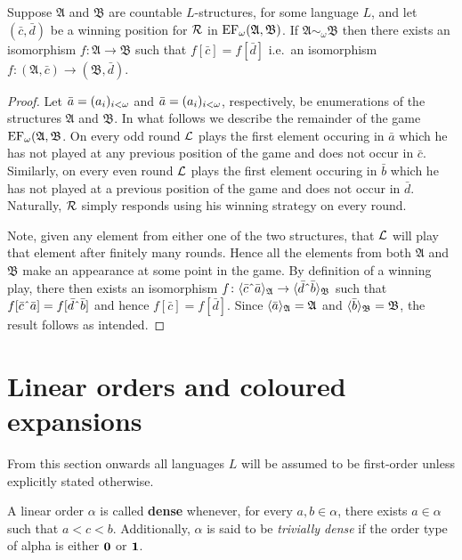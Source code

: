 \begin{prp}\label{prp:bfiso}
	Suppose $\mathfrak{A}$ and $\mathfrak{B}$ are countable $L$-structures, for some language $L$, and let $(\bar{c},\bar{d})$ be a winning position for $\mathcal{R}$ in $\operatorname{EF}_\omega(\mathfrak{A},\mathfrak{B})$.  If $\mathfrak{A}\sim_\omega\mathfrak{B}$ then there exists an isomorphism $f\colon\mathfrak{A}\to\mathfrak{B}$ such that $f[\bar{c}]=f[\bar{d}]$ i.e.\ an isomorphism $f\colon(\mathfrak{A},\bar{c})\to(\mathfrak{B},\bar{d})$.
\end{prp}
\begin{proof}
	Let $\bar{a}=(a_i)_{i<\omega}$ and $\bar{a}=(a_i)_{i<\omega}$, respectively, be enumerations of the structures $\mathfrak{A}$ and $\mathfrak{B}$.  In what follows we describe the remainder of the game $\operatorname{EF}_\omega(\mathfrak{A},\mathfrak{B}$.  On every odd round $\mathcal{L}$ plays the first element occuring in $\bar{a}$ which he has not played at any previous position of the game and does not occur in $\bar{c}$.  Similarly, on every even round $\mathcal{L}$ plays the first element occuring in $\bar{b}$ which he has not played at a previous position of the game and does not occur in $\bar{d}$.  Naturally, $\mathcal{R}$ simply responds using his winning strategy on every round.

	Note, given any element from either one of the two structures, that $\mathcal{L}$ will play that element after finitely many rounds.  Hence all the elements from both $\mathfrak{A}$ and $\mathfrak{B}$ make an appearance at some point in the game.  By definition of a winning play, there then exists an isomorphism $f\colon\gen{\bar{c}\string^\bar{a}}{\mathfrak{A}}\to\gen{\bar{d}\string^\bar{b}}{\mathfrak{B}}$ such that $f[\bar{c}\string^\bar{a}]=f[\bar{d}\string^\bar{b}]$ and hence $f[\bar{c}]=f[\bar{d}]$.  Since $\langle \bar{a}\rangle_{\mathfrak{A}}=\mathfrak{A}$ and $\langle \bar{b}\rangle_{\mathfrak{B}}=\mathfrak{B}$, the result follows as intended.
\end{proof}


\section{Linear orders and coloured expansions}

\begin{assn}
	From this section onwards all languages $L$ will be assumed to be first-order unless explicitly stated otherwise.
\end{assn}

\begin{dfn}
	A linear order $\alpha$ is called \textbf{dense} whenever, for every $a,b\in\alpha$, there exists $a\in\alpha$ such that $a<c<b$.  Additionally, $\alpha$ is said to be \textit{trivially dense} if the order type of alpha is either $\mathbf{0}$ or $\mathbf{1}$.
\end{dfn}

